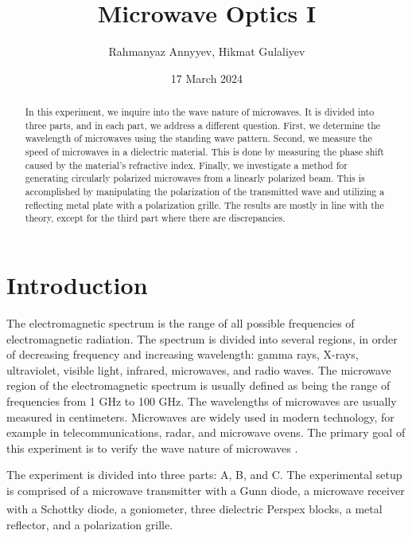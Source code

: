 \documentclass[10pt]{article}
\title{Microwave Optics I}
\author{Rahmanyaz Annyyev, Hikmat Gulaliyev}
\date{17 March 2024}
\begin{document}
\maketitle

\begin{abstract}
In this experiment, we inquire into the wave nature of microwaves. It is divided into three parts, and in each part, we address a different question. First, we determine the wavelength of microwaves using the standing wave pattern. Second, we measure the speed of microwaves in a dielectric material. This is done by measuring the phase shift caused by the material's refractive index. Finally, we investigate a method for generating circularly polarized microwaves from a linearly polarized beam. This is accomplished by manipulating the polarization of the transmitted wave and utilizing a reflecting metal plate with a polarization grille. The results are mostly in line with the theory, except for the third part where there are discrepancies.
\end{abstract}

\section{Introduction}

The electromagnetic spectrum is the range of all possible frequencies of electromagnetic radiation. The spectrum is divided into several regions, in order of decreasing frequency and increasing wavelength: gamma rays, X-rays, ultraviolet, visible light, infrared, microwaves, and radio waves. The microwave region of the electromagnetic spectrum is usually defined as being the range of frequencies from 1 GHz to 100 GHz. The wavelengths of microwaves are usually measured in centimeters. Microwaves are widely used in modern technology, for example in telecommunications, radar, and microwave ovens. The primary goal of this experiment is to verify the wave nature of microwaves \cite{Giancoli_2020}.

The experiment is divided into three parts: A, B, and C. The experimental setup is comprised of a microwave transmitter with a Gunn diode, a microwave receiver with a Schottky diode, a goniometer, three dielectric Perspex\textsuperscript{\textregistered} blocks, a metal reflector, and a polarization grille.
\end{document}
